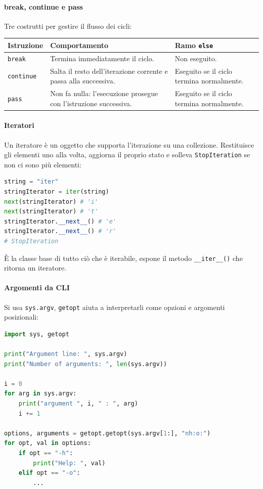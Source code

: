 \documentclass[12pt]{extarticle}
\begin{document}
\paragraph{break, continue e pass} Tre costrutti per gestire il flusso dei cicli:
\begin{center}
\small
\begin{tabular}{p{2.2cm}p{8.4cm}p{2.8cm}}
    \toprule
    \textbf{Istruzione} & \textbf{Comportamento} & \textbf{Ramo \texttt{else}} \\
    \midrule
    \texttt{break} & Termina immediatamente il ciclo. & Non eseguito. \\
    \addlinespace
    \texttt{continue} & Salta il resto dell'iterazione corrente e passa alla successiva. & Eseguito se il ciclo termina normalmente. \\
    \addlinespace
    \texttt{pass} & Non fa nulla: l'esecuzione prosegue con l'istruzione successiva. & Eseguito se il ciclo termina normalmente. \\
    \bottomrule
\end{tabular}
\end{center}

\paragraph{Iteratori} Un iteratore è un oggetto che supporta l'iterazione su una collezione. Restituisce gli elementi uno alla volta, aggiorna il proprio stato e solleva \texttt{StopIteration} se non ci sono più elementi:
\begin{lstlisting}[language=Python]
string = "iter"
stringIterator = iter(string)
next(stringIterator) # 'i'
next(stringIterator) # 't'
stringIterator.__next__() # 'e'
stringIterator.__next__() # 'r'
# StopIteration
\end{lstlisting}
È la classe base di tutto ciò che è iterabile, espone il metodo \texttt{\_\_iter\_\_()} che ritorna un iteratore.

\paragraph{Argomenti da CLI} Si usa \texttt{sys.argv}, \texttt{getopt} aiuta a interpretarli come opzioni e argomenti posizionali:
\begin{lstlisting}[language=Python]
import sys, getopt

print("Argument line: ", sys.argv)
print("Number of arguments: ", len(sys.argv))

i = 0
for arg in sys.argv:
    print("argument ", i, " : ", arg)
    i += 1

options, arguments = getopt.getopt(sys.argv[1:], "nh:o:")
for opt, val in options:
    if opt == "-h": 
        print("Help: ", val)
    elif opt == "-o":
        ...
\end{lstlisting}
\end{document}
